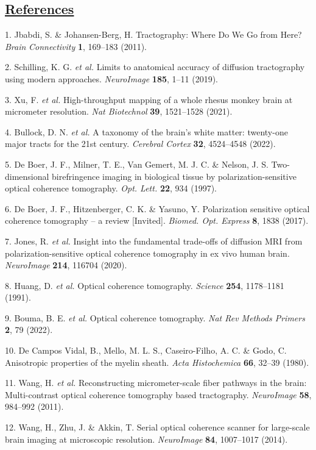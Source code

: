 \documentclass{article}
\begin{document}
\subsection*{\underline{References}}

\begin{hangpars}
1. Jbabdi, S. \& Johansen-Berg, H. Tractography: Where Do We Go from Here? \emph{Brain} \emph{Connectivity} \textbf{1}, 169–183 (2011).

2. Schilling, K. G. \emph{et al.} Limits to anatomical accuracy of diffusion tractography using modern approaches. \emph{NeuroImage} \textbf{185}, 1–11 (2019).

3. Xu, F. \emph{et al.} High-throughput mapping of a whole rhesus monkey brain at micrometer resolution. \emph{Nat Biotechnol} \textbf{39}, 1521–1528 (2021).

4. Bullock, D. N. \emph{et al.} A taxonomy of the brain’s white matter: twenty-one major tracts for the 21st century. \emph{Cerebral Cortex} \textbf{32}, 4524–4548 (2022).

5. De Boer, J. F., Milner, T. E., Van Gemert, M. J. C. \& Nelson, J. S. Two-dimensional birefringence imaging in biological tissue by polarization-sensitive optical coherence tomography. \emph{Opt. Lett.} \textbf{22}, 934 (1997).

6. De Boer, J. F., Hitzenberger, C. K. \& Yasuno, Y. Polarization sensitive optical coherence tomography – a review [Invited]. \emph{Biomed. Opt. Express} \textbf{8}, 1838 (2017).

7. Jones, R. \emph{et al.} Insight into the fundamental trade-offs of diffusion MRI from polarization-sensitive optical coherence tomography in ex vivo human brain. \emph{NeuroImage} \textbf{214}, 116704 (2020).

8. Huang, D. \emph{et al.} Optical coherence tomography. \emph{Science} \textbf{254}, 1178–1181 (1991).

9. Bouma, B. E. \emph{et al.} Optical coherence tomography. \emph{Nat Rev Methods Primers} \textbf{2}, 79 (2022).

10. De Campos Vidal, B., Mello, M. L. S., Caseiro-Filho, A. C. \& Godo, C. Anisotropic properties of the myelin sheath. \emph{Acta Histochemica} \textbf{66}, 32–39 (1980).

11. Wang, H. \emph{et al.} Reconstructing micrometer-scale fiber pathways in the brain: Multi-contrast optical coherence tomography based tractography. \emph{NeuroImage} \textbf{58}, 984–992 (2011).

12. Wang, H., Zhu, J. \& Akkin, T. Serial optical coherence scanner for large-scale brain imaging at microscopic resolution. \emph{NeuroImage} \textbf{84}, 1007–1017 (2014).


\end{hangpars}
\end{document}

